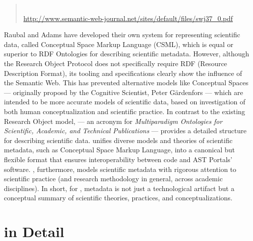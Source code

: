 \documentclass[10pt,letterpaper]{article}
\newcommand{\rpdfLink}[1]{\href{#1}{\small{#1}}}
\begin{document}
\begin{quote}{}\\
\rpdfLink{http://www.semantic-web-journal.net/sites/default/files/swj37\_0.pdf}
\end{quote}

Raubal and Adams have developed their own system 
for representing scientific data, called Conceptual 
Space Markup Language (CSML), which is  
equal or superior to RDF Ontologies for describing 
scientific metadata.  However, 
although the Research Object Protocol 
does not specifically require RDF (Resource Description 
Format), its tooling and specifications clearly 
show the influence of the Semantic Web.  
This has prevented alternative models like 
Conceptual Spaces --- originally proposd 
by the Cognitive Scientist, Peter G\"ardenfors 
--- which are intended to be more 
accurate models of scientific data, based on investigation 
of both human conceptualization and scientific practice. 
\p{} 
In contrast to the existing Research Object model, 
{\MOSAIC} --- an acronym for \textit{Multiparadigm 
Ontologies for Scientific, Academic, and Technical Publications} 
--- provides a detailed structure for 
describing scientific data.  
{\lfMOSAIC} unifies diverse models and theories of 
scientific metadata, such as Conceptual 
Space Markup Language, into a canonical but flexible format 
that ensures interoperability between {\RO} code 
and AST Portals' software.  {\lfMOSAIC}, furthermore, 
models scientific metadata with rigorous attention 
to scientific practice (and research methodology 
in general, across academic disciplines).  In 
short, for {\MOSAIC}, metadata is not just a technological 
artifact but a conceptual summary of scientific theories, 
practices, and conceptualizations.  
\p{}
\section{{\lMOSAIC} in Detail}
\end{document}
